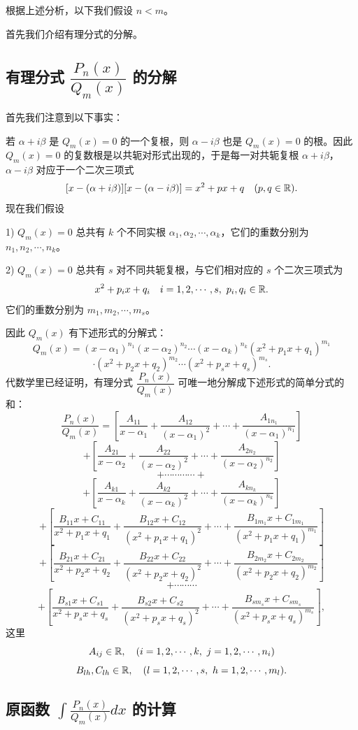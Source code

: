 根据上述分析，以下我们假设 \(n<m\)。

首先我们介绍有理分式的分解。

\subsection{有理分式 \(\dfrac{P_n(x)}{Q_m(x)}\) 的分解}

首先我们注意到以下事实：

若 \(\alpha+i\beta\) 是 \(Q_m(x)=0\) 的一个复根，则 \(\alpha-i\beta\) 也是 \(Q_m(x)=0\) 的根。因此 \(Q_m(x)=0\) 的复数根是以共轭对形式出现的，于是每一对共轭复根 \(\alpha+i\beta\)，\(\alpha-i\beta\) 对应于一个二次三项式
\[
[x-(\alpha+i\beta)][x-(\alpha-i\beta)]=x^2+px+q\quad(p,q\in\mathbb{R}).
\]
现在我们假设

1) \(Q_m(x)=0\) 总共有 \(k\) 个不同实根 \(\alpha_1,\alpha_2,\cdots,\alpha_k\)，它们的重数分别为 \(n_1,n_2,\cdots,n_k\)。

2) \(Q_m(x)=0\) 总共有 \(s\) 对不同共轭复根，与它们相对应的 \(s\) 个二次三项式为
\[
x^2+p_ix+q_i\quad i=1,2,\cdots,s,\ p_i,q_i\in\mathbb{R}.
\]
它们的重数分别为 \(m_1,m_2,\cdots,m_s\)。

因此 \(Q_m(x)\) 有下述形式的分解式：
\[
Q_m(x)=(x-\alpha_1)^{n_1}(x-\alpha_2)^{n_2}\cdots(x-\alpha_k)^{n_k}(x^2+p_1x+q_1)^{m_1}
\]
\[
\cdot(x^2+p_2x+q_2)^{m_2}\cdots(x^2+p_sx+q_s)^{m_s}.
\]
代数学里已经证明，有理分式 \(\dfrac{P_n(x)}{Q_m(x)}\) 可唯一地分解成下述形式的简单分式的和：
\[
\frac{P_n(x)}{Q_m(x)}=\left[\frac{A_{11}}{x-\alpha_1}+\frac{A_{12}}{(x-\alpha_1)^2}+\cdots+\frac{A_{1n_1}}{(x-\alpha_1)^{n_1}}\right]
\]
\[
+\left[\frac{A_{21}}{x-\alpha_2}+\frac{A_{22}}{(x-\alpha_2)^2}+\cdots+\frac{A_{2n_2}}{(x-\alpha_2)^{n_2}}\right]
\]
\[
+\cdots\cdots\cdots\cdots+
\]
\[
+\left[\frac{A_{k1}}{x-\alpha_k}+\frac{A_{k2}}{(x-\alpha_k)^2}+\cdots+\frac{A_{kn_k}}{(x-\alpha_k)^{n_k}}\right]
\]
\[
+\left[\frac{B_{11}x+C_{11}}{x^2+p_1x+q_1}+\frac{B_{12}x+C_{12}}{(x^2+p_1x+q_1)^2}+\cdots+\frac{B_{1m_1}x+C_{1m_1}}{(x^2+p_1x+q_1)^{m_1}}\right]
\]
\[
+\left[\frac{B_{21}x+C_{21}}{x^2+p_2x+q_2}+\frac{B_{22}x+C_{22}}{(x^2+p_2x+q_2)^2}+\cdots+\frac{B_{2m_2}x+C_{2m_2}}{(x^2+p_2x+q_2)^{m_2}}\right]
\]
\[
+\cdots\cdots\cdots
\]
\[
+\left[\frac{B_{s1}x+C_{s1}}{x^2+p_sx+q_s}+\frac{B_{s2}x+C_{s2}}{(x^2+p_sx+q_s)^2}+\cdots+\frac{B_{sm_s}x+C_{sm_s}}{(x^2+p_sx+q_s)^{m_s}}\right],
\]
这里
\[
A_{ij}\in\R,\quad(i=1,2,\cdots,k,\ j=1,2,\cdots,n_i)
\]
\[
B_{lh},C_{lh}\in\R,\quad(l=1,2,\cdots,s,\ h=1,2,\cdots,m_l).
\]

\subsection{原函数 \(\displaystyle\int\frac{P_n(x)}{Q_m(x)}dx\) 的计算}

